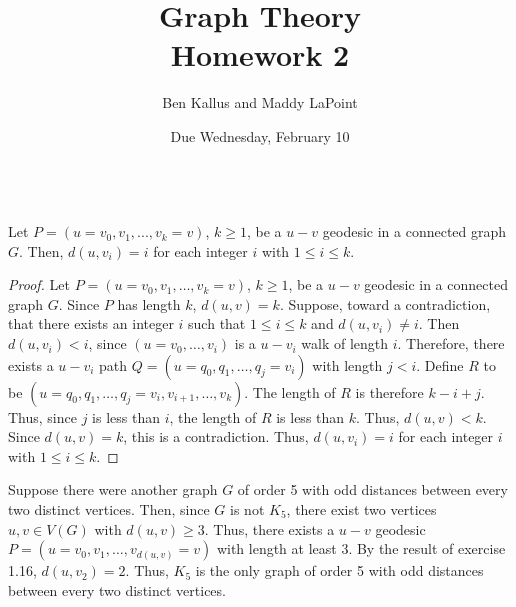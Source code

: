 \documentclass[12pt]{article}
\title{Graph Theory \\ Homework 2}
\author{Ben Kallus and Maddy LaPoint}
\date{Due Wednesday, February 10}
\begin{document}
\maketitle

\\

 Let $P = (u=v_0,v_1,...,v_k=v)$, $k\geq 1$, be a $u - v$ geodesic in a connected graph $G$. Then, $d(u,v_i) = i$ for each integer $i$ with $1 \leq i \leq k$.
\begin{proof}
    Let $P = (u = v_0, v_1, \hdots, v_k = v)$, $k \geq 1$, be a $u-v$ geodesic in a connected graph $G$.
    Since $P$ has length $k$, $d(u,v)=k$.
    Suppose, toward a contradiction, that there exists an integer $i$ such that $1 \leq i \leq k$ and $d(u,v_i) \neq i$.
    Then $d(u,v_i) < i$, since $(u = v_0, \hdots, v_i)$ is a $u-v_i$ walk of length $i$.
    Therefore, there exists a $u-v_i$ path $Q = (u=q_0, q_1, \hdots, q_j=v_i)$ with length $j < i$.
    Define $R$ to be $(u=q_0, q_1, \hdots, q_j=v_i, v_{i+1}, \hdots, v_k)$.
    The length of $R$ is therefore $k - i + j$.
    Thus, since $j$ is less than $i$, the length of $R$ is less than $k$.
    Thus, $d(u,v) < k$. Since $d(u,v) = k$, this is a contradiction.
    Thus, $d(u,v_i)=i$ for each integer $i$ with $1 \leq i \leq k$.
\end{proof}

\bigskip
{}
\begin{center}
\end{center}

    Suppose there were another graph $G$ of order 5 with odd distances between every two distinct vertices.
    Then, since $G$ is not $K_5$, there exist two vertices $u,v \in V(G)$ with $d(u,v) \geq 3$.
    Thus, there exists a $u-v$ geodesic $P = (u=v_0, v_1, \hdots, v_{d(u,v)}=v)$ with length at least 3.
    By the result of exercise 1.16, $d(u,v_2) = 2$.
    Thus, $K_5$ is the only graph of order 5 with odd distances between every two distinct vertices.
\end{document}
